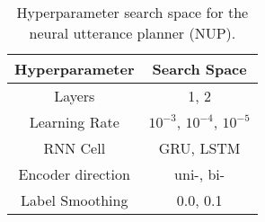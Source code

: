 \begin{table}
\centering
\begin{tabular}{cc}
\toprule
Hyperparameter & Search Space\\
\midrule
Layers & 1, 2\\
Learning Rate &$10^{-3}$, $10^{-4}$, $10^{-5}$\\
RNN Cell & GRU, LSTM \\
Encoder direction & uni-, bi- \\
Label Smoothing & 0.0, 0.1\\
\bottomrule
\end{tabular}
\caption{Hyperparameter search space for the neural utterance planner (NUP).}
\label{tab:nuphps}
\end{table}
